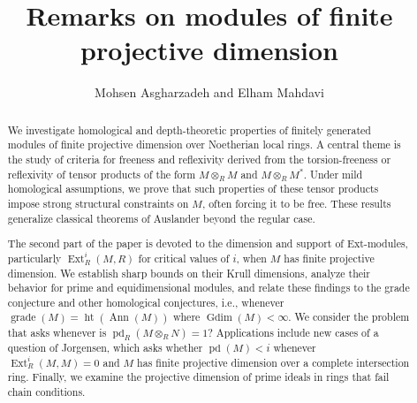 \documentclass[11.05pt,a4paper]{amsart}
\theoremstyle{definition}
\theoremstyle{remark}
\newcommand{\pd}{\operatorname{pd}}
\newcommand{\Gdim}{\operatorname{Gdim}}
\begin{document}
\author[M. Asgharzadeh  and E. Mahdavi]{Mohsen Asgharzadeh and Elham Mahdavi}

\title[Remarks on modules of finite projective dimension]{Remarks on modules of finite projective dimension}

\address{M. Asgharzadeh }

\address{E. Mahdavi}




\begin{abstract}
	We investigate homological and depth-theoretic properties of finitely generated modules of finite projective dimension over Noetherian local rings. A central theme is the study of criteria for freeness and reflexivity derived from the torsion-freeness or reflexivity of tensor products of the form \( M \otimes_R M \) and \( M \otimes_R M^* \). Under mild homological assumptions, we prove that such properties of these tensor products impose strong structural constraints on \( M \), often forcing it to be free. These results generalize classical theorems of Auslander beyond the regular case.
	
	The second part of the paper is devoted to the dimension and support of Ext-modules, particularly \( \operatorname{Ext}^i_R(M, R) \) for critical values of \( i \), when \( M \) has finite projective dimension. We establish sharp bounds on their Krull dimensions, analyze their behavior for prime and equidimensional modules, and relate these findings to the grade conjecture and other homological conjectures, i.e.,  whenever
	$\operatorname{grade}(M) = \operatorname{ht}(\operatorname{Ann}(M))$ where $\Gdim(M)<\infty$.
	 We consider the problem that asks whenever is \( \pd_R(M \otimes_R N) = 1 \)? Applications include new cases of a question of Jorgensen, which asks whether \( \operatorname{pd}(M) < i \) whenever \( \operatorname{Ext}^i_R(M, M) = 0 \) and \( M \) has finite projective dimension over a complete intersection ring.
	Finally, we examine the projective dimension of prime ideals in rings that fail chain conditions. 
\end{abstract}

\maketitle
 \tableofcontents
\end{document}
